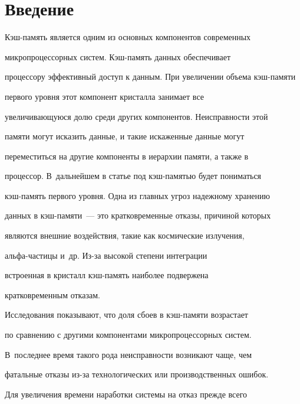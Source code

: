       

            \label{st\stat}

            

            \vspace*{-12pt}

   

    \section{Введение}

    

    Кэш-память является одним из основных компонентов современных 

микропроцессорных систем. Кэш-память данных обеспечивает 

процессору эффективный доступ к данным. При увеличении объема кэш-памяти 

первого уровня этот компонент кристалла занимает все 

увеличивающуюся долю среди других компонентов. Неисправности этой 

памяти могут исказить данные, и такие искаженные данные могут 

переместиться на другие компоненты в иерархии памяти, а также в 

процессор. В~дальнейшем в статье под кэш-памятью будет пониматься 

кэш-память первого уровня. Одна из главных угроз надежному хранению 

данных в кэш-памяти~--- это кратковременные отказы, причиной которых 

являются внешние воздействия, такие как космические излучения, 

    альфа-частицы и~др. Из-за высокой степени интеграции 

встроенная в кристалл кэш-память наиболее подвержена 

кратковременным отказам. 

    

    Исследования показывают, что доля сбоев в кэш-памяти возрастает 

по сравнению с другими компонентами микропроцессорных систем. 

В~последнее время такого рода неисправности возникают чаще, чем 

фатальные отказы из-за технологических или производственных ошибок.

    

    Для увеличения времени наработки системы на отказ прежде всего 


